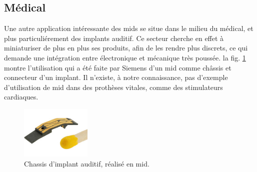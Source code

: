 \subsection{Médical}
Une autre application intéressante des \glspl{mid} se situe dans le milieu du médical, et plus particuliérement des implants auditif.
Ce secteur cherche en effet à miniaturiser de plus en plus ses produits, afin de les rendre plus discrets, ce qui demande une intégration entre électronique et mécanique très poussée.
la fig. \ref{fig:mid-siemens-example} montre l'utilisation qui a été faite par Siemens d'un \gls{mid} comme châssis et connecteur d'un implant.
Il n'existe, à notre connaissance, pas d'exemple d'utilisation de \gls{mid} dans des prothèses vitales, comme des stimulateurs cardiaques.


\begin{figure}[h]
    \begin{center}
        \includegraphics[width=0.3\textwidth]{images/mid-hearing-aid}
        \caption{Chassis d'implant auditif, réalisé en \gls{mid}.}
        \label{fig:mid-siemens-example}
    \end{center}
\end{figure}

